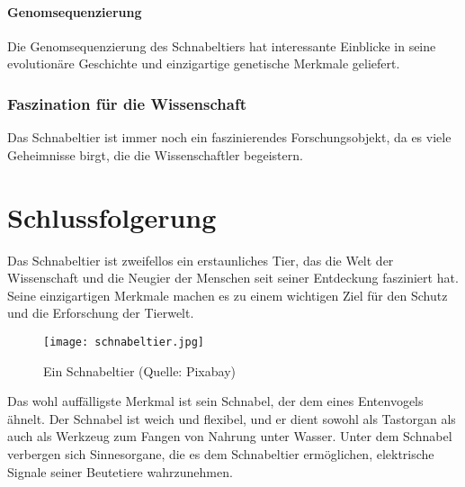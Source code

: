 \documentclass{article}
\begin{document}
        \subsection{Genomsequenzierung}
        Die Genomsequenzierung des Schnabeltiers hat interessante Einblicke in seine evolutionäre Geschichte und einzigartige genetische Merkmale geliefert.

    \section{Faszination für die Wissenschaft}
    Das Schnabeltier ist immer noch ein faszinierendes Forschungsobjekt, da es viele Geheimnisse birgt, die die Wissenschaftler begeistern.


\part{Schlussfolgerung}
    Das Schnabeltier ist zweifellos ein erstaunliches Tier, das die Welt der Wissenschaft und die Neugier der Menschen seit seiner Entdeckung fasziniert hat. Seine einzigartigen Merkmale machen es zu einem wichtigen Ziel für den Schutz und die Erforschung der Tierwelt.

    \begin{figure}[h]
      \centering
      \texttt{[image: schnabeltier.jpg]}
      \caption{Ein Schnabeltier (Quelle: Pixabay)}
    \end{figure}

    Das wohl auffälligste Merkmal ist sein Schnabel, der dem eines Entenvogels ähnelt. Der Schnabel ist weich und flexibel, und er dient sowohl als Tastorgan als auch als Werkzeug zum Fangen von Nahrung unter Wasser. Unter dem Schnabel verbergen sich Sinnesorgane, die es dem Schnabeltier ermöglichen, elektrische Signale seiner Beutetiere wahrzunehmen.
\end{document}
